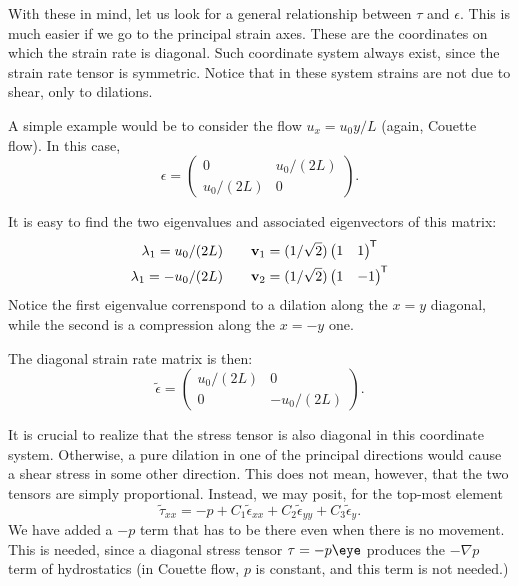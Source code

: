With these in mind, let us look for a general relationship between
$\tau$ and $\epsilon$. This is much easier if we go to the principal
strain axes. These are the coordinates on which the strain rate is
diagonal. Such coordinate system always exist, since the strain rate
tensor is symmetric. Notice that in these system strains are not due to
shear, only to dilations.

A simple example would be to consider the flow $u_x = u_0 y / L$
(again, Couette flow). In this case,
\[
\epsilon=
\begin{pmatrix}
  0           &   u_0/(2L)  \\
   u_0/(2L)   &   0
\end{pmatrix} .
\]

It is easy to find the two eigenvalues and associated eigenvectors of
this matrix:
\begin{align*}
  \lambda_1=  u_0/(2L) \qquad &\mathbf{v}_1=(1/\sqrt{2}) \begin{pmatrix} 1 &  1 \end{pmatrix}^{\mkern-1.5mu\mathsf{T}} \\
  \lambda_1= -u_0/(2L) \qquad &\mathbf{v}_2=(1/\sqrt{2})  \begin{pmatrix} 1 &  -1 \end{pmatrix}^{\mkern-1.5mu\mathsf{T}} \\
\end{align*}
Notice the first eigenvalue correnspond to a dilation along the $x=y$
diagonal, while the second is a compression along the $x=-y$ one.

The diagonal strain rate matrix is then:
\[
\tilde{\epsilon}=
\begin{pmatrix}
  u_0/(2L)   & 0 \\
  0          & - u_0/(2L)
\end{pmatrix} .
\]

It is crucial to realize that the stress tensor is also diagonal in
this coordinate system. Otherwise, a pure dilation in one of the
principal directions would cause a shear stress in some other
direction. This does not mean, however, that the two tensors are
simply proportional. Instead, we may posit, for the top-most element
\[
\tilde{\tau}_{xx}=
- p + 
C_1 \tilde{\epsilon}_{xx} +
C_2 \tilde{\epsilon}_{yy} +
C_3 \tilde{\epsilon}_{y} .
\]
We have added a $-p$ term that has to be there even when there is no
movement. This is needed, since a diagonal stress tensor $\tau=-p\eye$
produces the $-\nabla p$ term of hydrostatics (in Couette flow, $p$ is
constant, and this term is not needed.)

